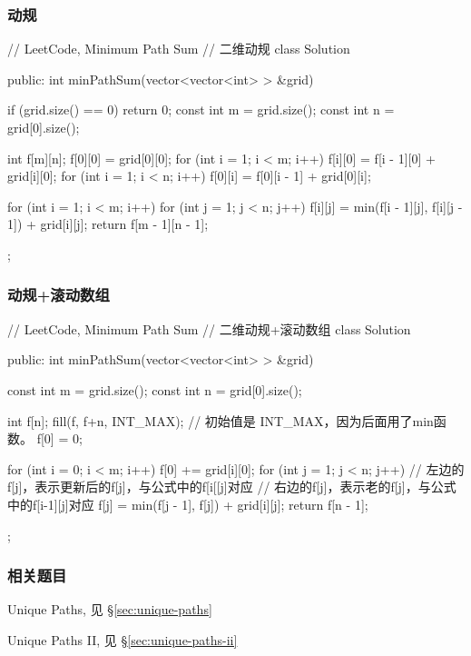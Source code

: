 \subsubsection{动规}
\begin{Code}
// LeetCode, Minimum Path Sum
// 二维动规
class Solution {
public:
    int minPathSum(vector<vector<int> > &grid) {
        if (grid.size() == 0) return 0;
        const int m = grid.size();
        const int n = grid[0].size();

        int f[m][n];
        f[0][0] = grid[0][0];
        for (int i = 1; i < m; i++) {
            f[i][0] = f[i - 1][0] + grid[i][0];
        }
        for (int i = 1; i < n; i++) {
            f[0][i] = f[0][i - 1] + grid[0][i];
        }

        for (int i = 1; i < m; i++) {
            for (int j = 1; j < n; j++) {
                f[i][j] = min(f[i - 1][j], f[i][j - 1]) + grid[i][j];
            }
        }
        return f[m - 1][n - 1];
    }
};
\end{Code}


\subsubsection{动规+滚动数组}
\begin{Code}
// LeetCode, Minimum Path Sum
// 二维动规+滚动数组
class Solution {
public:
    int minPathSum(vector<vector<int> > &grid) {
        const int m = grid.size();
        const int n = grid[0].size();

        int f[n];
        fill(f, f+n, INT_MAX); // 初始值是 INT_MAX，因为后面用了min函数。
        f[0] = 0;

        for (int i = 0; i < m; i++) {
            f[0] += grid[i][0];
            for (int j = 1; j < n; j++) {
                // 左边的f[j]，表示更新后的f[j]，与公式中的f[i[[j]对应
                // 右边的f[j]，表示老的f[j]，与公式中的f[i-1][j]对应
                f[j] = min(f[j - 1], f[j]) + grid[i][j];
            }
        }
        return f[n - 1];
    }
};
\end{Code}

\subsubsection{相关题目}
\begindot
\item Unique Paths, 见 \S \ref{sec:unique-paths}
\item Unique Paths II, 见 \S \ref{sec:unique-paths-ii}
\myenddot


